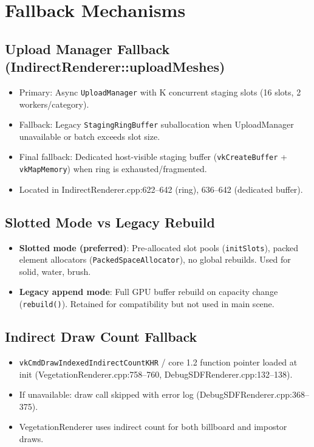\documentclass[11pt,a4paper]{article}
\begin{document}
\section{Fallback Mechanisms}

\subsection{Upload Manager Fallback (IndirectRenderer::uploadMeshes)}
\begin{itemize}
    \item Primary: Async \texttt{UploadManager} with K concurrent staging slots (16 slots, 2 workers/category).
    \item Fallback: Legacy \texttt{StagingRingBuffer} suballocation when UploadManager unavailable or batch exceeds slot size.
    \item Final fallback: Dedicated host-visible staging buffer (\texttt{vkCreateBuffer} + \texttt{vkMapMemory}) when ring is exhausted/fragmented.
    \item Located in IndirectRenderer.cpp:622–642 (ring), 636–642 (dedicated buffer).
\end{itemize}

\subsection{Slotted Mode vs Legacy Rebuild}
\begin{itemize}
    \item \textbf{Slotted mode (preferred)}: Pre-allocated slot pools (\texttt{initSlots}), packed element allocators (\texttt{PackedSpaceAllocator}), no global rebuilds. Used for solid, water, brush.
    \item \textbf{Legacy append mode}: Full GPU buffer rebuild on capacity change (\texttt{rebuild()}). Retained for compatibility but not used in main scene.
\end{itemize}

\subsection{Indirect Draw Count Fallback}
\begin{itemize}
    \item \texttt{vkCmdDrawIndexedIndirectCountKHR} / core 1.2 function pointer loaded at init (VegetationRenderer.cpp:758–760, DebugSDFRenderer.cpp:132–138).
    \item If unavailable: draw call skipped with error log (DebugSDFRenderer.cpp:368–375).
    \item VegetationRenderer uses indirect count for both billboard and impostor draws.
\end{itemize}
\end{document}
